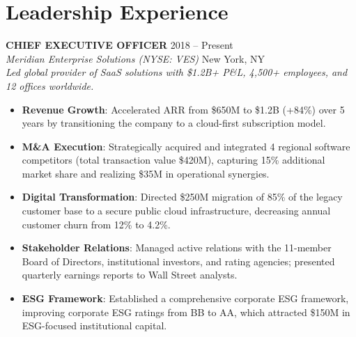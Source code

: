 \documentclass[10pt,letterpaper]{article}
\begin{document}
\section*{Leadership Experience}

\noindent
\textbf{\large\color{primaryColor} CHIEF EXECUTIVE OFFICER} \hfill {\color{subtleColor}\small 2018 -- Present} \\
\textit{Meridian Enterprise Solutions (NYSE: VES)} \hfill {\color{subtleColor}\small New York, NY} \\
\vspace{3pt}
{\color{textColor}\small\textit{Led global provider of SaaS solutions with \$1.2B+ P\&L, 4,500+ employees, and 12 offices worldwide.}}
\begin{itemize}
    \item \textbf{Revenue Growth}: Accelerated ARR from \$650M to \$1.2B (+84\%) over 5 years by transitioning the company to a cloud-first subscription model.
    \item \textbf{M\&A Execution}: Strategically acquired and integrated 4 regional software competitors (total transaction value \$420M), capturing 15\% additional market share and realizing \$35M in operational synergies.
    \item \textbf{Digital Transformation}: Directed \$250M migration of 85\% of the legacy customer base to a secure public cloud infrastructure, decreasing annual customer churn from 12\% to 4.2\%.
    \item \textbf{Stakeholder Relations}: Managed active relations with the 11-member Board of Directors, institutional investors, and rating agencies; presented quarterly earnings reports to Wall Street analysts.
    \item \textbf{ESG Framework}: Established a comprehensive corporate ESG framework, improving corporate ESG ratings from BB to AA, which attracted \$150M in ESG-focused institutional capital.
\end{itemize}

\vspace{12pt}
\end{document}
